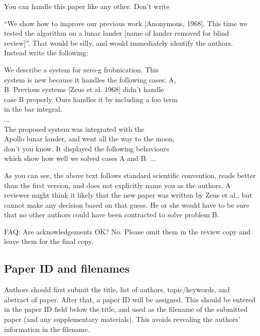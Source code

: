 \documentclass[10pt,conference,a4paper]{IEEEtran}
\begin{document}
You can handle this paper like any other. Don’t write

``We show how to improve our previous work [Anonymous, 1968]. This time we tested the algorithm 
on a lunar lander [name of lander removed for blind review]''. That would be silly, and would immediately 
identify the authors. Instead write the following:

\begin{flushleft}
\setlength{\leftskip}{.15in}
We describe a system for zero-g frobnication. This\\ 
system is new because it handles the following cases: A,\\
 B. Previous systems [Zeus et al. 1968] didn’t handle \\
case B properly. Ours handles it by including a foo term \\
in the bar integral.\\
...\\
The proposed system was integrated with the\\
Apollo lunar lander, and went all the way to the moon,\\
 don’t you know. It displayed the following behaviours \\
which show how well we solved cases A and B: ...\\
\setlength{\leftskip}{0in}
\end{flushleft}

As you can see, the above text follows standard scientific convention, reads better than the first version, 
and does not explicitly name you as the authors. A reviewer might think it likely that the new paper was 
written by Zeus et al., but cannot make any decision based on that guess. He or she would have to be sure 
that no other authors could have been contracted to solve problem B. 

FAQ: Are acknowledgements OK? No. Please omit them in the review copy and leave them for the final copy.

\subsection{Paper ID and filenames}
Authors should first submit the title, list of authors,
topic/keywords, and abstract of paper. After that, a paper ID 
will be assigned. This should be entered in the paper ID field
below the title, and used as the filename of the submitted 
paper (and any supplementary materials). This avoids 
revealing the authors' information in the filename.
\end{document}
